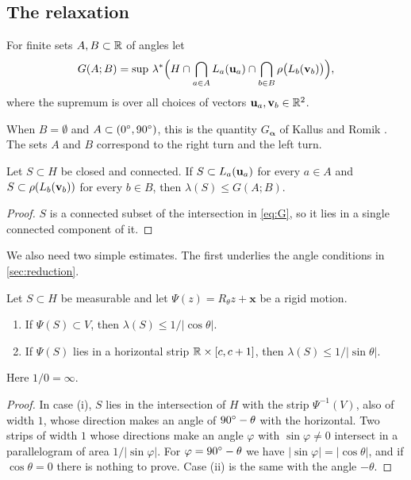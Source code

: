 \subsection{The relaxation}

\begin{defn}\label{def:G}
For finite sets $A,B\subset\mathbb{R}$ of angles let
\begin{equation}\label{eq:G}
G(A;B)=\sup\,\lambda^{*}\Big(H\cap\bigcap_{a\in A}L_a(\mathbf{u}_a)\cap\bigcap_{b\in B}\rho\big(L_b(\mathbf{v}_b)\big)\Big),
\end{equation}
where the supremum is over all choices of vectors $\mathbf{u}_a,\mathbf{v}_b\in\mathbb{R}^2$.
\end{defn}

When $B=\emptyset$ and $A\subset(0^{\circ},90^{\circ})$, this is the quantity $G_{\boldsymbol\alpha}$ of Kallus and Romik \cite{kallusromik2018}. The sets $A$ and $B$ correspond to the right turn and the left turn.

\begin{lem}\label{lem:relax}
Let $S\subset H$ be closed and connected. If $S\subset L_a(\mathbf{u}_a)$ for every $a\in A$ and $S\subset\rho(L_b(\mathbf{v}_b))$ for every $b\in B$, then $\lambda(S)\le G(A;B)$.
\end{lem}

\begin{proof}
$S$ is a connected subset of the intersection in \eqref{eq:G}, so it lies in a single connected component of it.
\end{proof}

We also need two simple estimates. The first underlies the angle conditions in \cref{sec:reduction}.

\begin{lem}\label{lem:strips}
Let $S\subset H$ be measurable and let $\Psi(z)=R_\theta z+\mathbf{x}$ be a rigid motion.
\begin{enumerate}[label=(\roman*)]
\item If $\Psi(S)\subset V$, then $\lambda(S)\le 1/|\cos\theta|$.
\item If $\Psi(S)$ lies in a horizontal strip $\mathbb{R}\times[c,c+1]$, then $\lambda(S)\le1/|\sin\theta|$.
\end{enumerate}
Here $1/0=\infty$.
\end{lem}

\begin{proof}
In case (i), $S$ lies in the intersection of $H$ with the strip $\Psi^{-1}(V)$, also of width $1$, whose direction makes an angle of $90^{\circ}-\theta$ with the horizontal. Two strips of width $1$ whose directions make an angle $\varphi$ with $\sin\varphi\neq0$ intersect in a parallelogram of area $1/|\sin\varphi|$. For $\varphi=90^{\circ}-\theta$ we have $|\sin\varphi|=|\cos\theta|$, and if $\cos\theta=0$ there is nothing to prove. Case (ii) is the same with the angle $-\theta$.
\end{proof}

